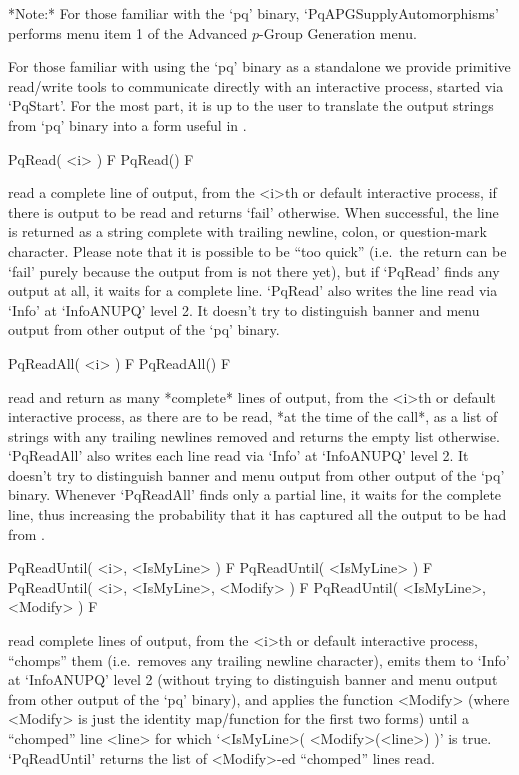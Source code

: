 *Note:*
For those  familiar  with  the  `pq'  binary,  `PqAPGSupplyAutomorphisms'
performs menu item 1 of the Advanced $p$-Group Generation menu.


For those familiar with using the `pq' binary as a standalone we  provide
primitive read/write tools to communicate directly  with  an  interactive
{\ANUPQ} process, started via `PqStart'. For the most part, it is  up  to
the user to translate the output strings from `pq'  binary  into  a  form
useful in {\GAP}.

\>PqRead( <i> ) F
\>PqRead() F

read a complete line of  {\ANUPQ}  output,  from  the  <i>th  or  default
interactive {\ANUPQ} process, if there is output to be read  and  returns
`fail' otherwise. When successful, the  line  is  returned  as  a  string
complete with trailing newline, colon, or question-mark character. Please
note that it is possible to be ``too  quick''  (i.e.~the  return  can  be
`fail' purely because the output from {\ANUPQ} is not there yet), but  if
`PqRead' finds any output at all, it waits for a complete line.  `PqRead'
also writes the line read via `Info' at `InfoANUPQ' level 2.  It  doesn't
try to distinguish banner and menu output from other output of  the  `pq'
binary.

\>PqReadAll( <i> ) F
\>PqReadAll() F

read and return as many *complete* lines of  {\ANUPQ}  output,  from  the
<i>th or default interactive {\ANUPQ} process, as there are to  be  read,
*at the time of the call*,  as  a  list  of  strings  with  any  trailing
newlines removed and returns the empty list otherwise.  `PqReadAll'  also
writes each line read via `Info' at `InfoANUPQ' level 2. It  doesn't  try
to distinguish banner and menu output  from  other  output  of  the  `pq'
binary. Whenever `PqReadAll' finds only a partial line, it waits for  the
complete line, thus increasing the probability that it has  captured  all
the output to be had from {\ANUPQ}.

\>PqReadUntil( <i>, <IsMyLine> ) F
\>PqReadUntil( <IsMyLine> ) F
\>PqReadUntil( <i>, <IsMyLine>, <Modify> ) F
\>PqReadUntil( <IsMyLine>, <Modify> ) F

read complete lines  of  {\ANUPQ}  output,  from  the  <i>th  or  default
interactive {\ANUPQ} process, ``chomps'' them (i.e.~removes any  trailing
newline character), emits them to `Info' at `InfoANUPQ' level 2  (without
trying to distinguish banner and menu output from  other  output  of  the
`pq' binary), and applies the function <Modify> (where <Modify>  is  just
the identity map/function for the first two forms)  until  a  ``chomped''
line  <line>  for  which  `<IsMyLine>(  <Modify>(<line>)  )'   is   true.
`PqReadUntil' returns the list of <Modify>-ed ``chomped'' lines read.

